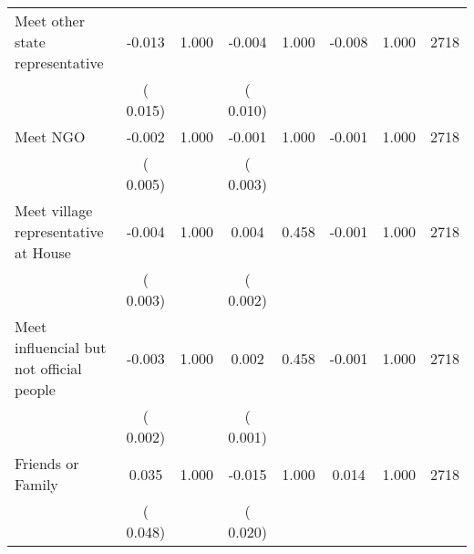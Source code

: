 \begin{tabular}{l*{7}{c}}
 Meet other state representative       &             -0.013       &        1.000  &             -0.004       &        1.000  &             -0.008       &              1.000 &  2718 \\ 
                       &       (       0.015)             &                               &       (       0.010)                     &                               &                                               &                                &                      \\ 

 Meet NGO       &             -0.002       &        1.000  &             -0.001       &        1.000  &             -0.001       &              1.000 &  2718 \\ 
                       &       (       0.005)             &                               &       (       0.003)                     &                               &                                               &                                &                      \\ 

 Meet village representative at House       &             -0.004       &        1.000  &              0.004       &        0.458  &             -0.001       &              1.000 &  2718 \\ 
                       &       (       0.003)             &                               &       (       0.002)                     &                               &                                               &                                &                      \\ 

 Meet influencial but not official people       &             -0.003       &        1.000  &              0.002       &        0.458  &             -0.001       &              1.000 &  2718 \\ 
                       &       (       0.002)             &                               &       (       0.001)                     &                               &                                               &                                &                      \\ 

 Friends or Family       &              0.035       &        1.000  &             -0.015       &        1.000  &              0.014       &              1.000 &  2718 \\ 
                       &       (       0.048)             &                               &       (       0.020)                     &                               &                                               &                                &                      \\ 


\end{tabular}
